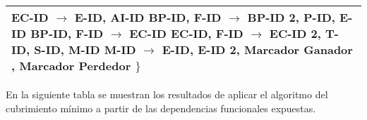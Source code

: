 \documentclass{report}
\begin{document}
\begin{tabularx}{\textwidth}{|X|}
                \hspace*{0.9cm} EC-ID $\rightarrow$ E-ID,  AI-ID \newline
                \hspace*{0.9cm} BP-ID,  F-ID $\rightarrow$ BP-ID 2,  P-ID,  E-ID \newline
                \hspace*{0.9cm} BP-ID,  F-ID $\rightarrow$ EC-ID \newline
                \hspace*{0.9cm} EC-ID,  F-ID $\rightarrow$ EC-ID 2,  T-ID,  S-ID, M-ID \newline 
                \hspace*{0.9cm} M-ID $\rightarrow$ E-ID, E-ID 2, Marcador Ganador , Marcador Perdedor \newline       
        $\} $
        \vspace*{0.15cm} \\    
        \bottomrule
    \end{tabularx}

    \vspace*{0.5cm}

    En la siguiente tabla se muestran los resultados de aplicar el algoritmo del cubrimiento mínimo a partir de las 
    dependencias funcionales expuestas.
\end{document}
